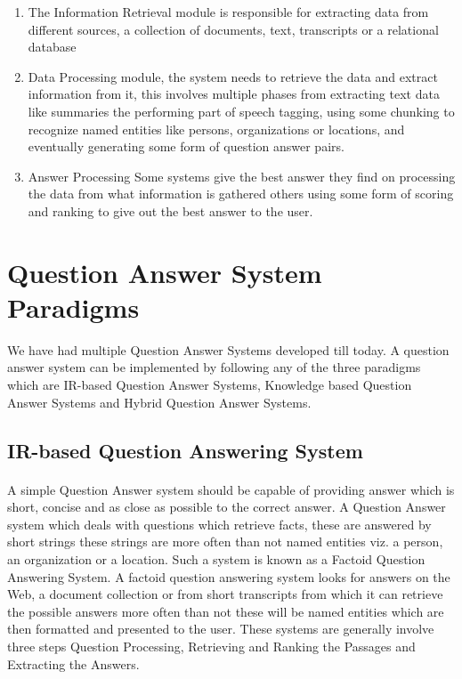 \begin{enumerate}
\item The Information Retrieval module is responsible for extracting data from different sources, a collection of documents, text, transcripts or a relational database
\item Data Processing module, the system needs to retrieve the data and extract information from it, this involves multiple phases from extracting text data like summaries the performing part of speech tagging, using some chunking to recognize named entities like persons, organizations or locations, and eventually generating some form of question answer pairs.
\item Answer Processing Some systems give the best answer they find on processing the data from what information is gathered others using some form of scoring and ranking to give out the best answer to the user.
\end{enumerate}

\section{Question Answer System Paradigms}
We have had multiple Question Answer Systems developed till today.
A question answer system can be implemented by following any of the three paradigms \cite {wongso2016literature} which are IR-based Question Answer Systems, Knowledge based Question Answer Systems and Hybrid Question Answer Systems.

\subsection{IR-based Question Answering System}
\paragraph{}
A simple Question Answer system should be capable of providing answer which is short, concise and as close as possible to the correct answer. A Question Answer system which deals with questions which retrieve facts, these are answered by short strings these strings are more often than not named entities viz. a person, an organization or a location. Such a system is known as a Factoid Question Answering System. A factoid question answering system looks for answers on the Web, a document collection or from short transcripts from which it can retrieve the possible answers more often than not these will be named entities \cite {chopra2016named} which are then formatted and presented to the user. These systems are generally involve three steps Question Processing, Retrieving and Ranking the Passages and Extracting the Answers. 

